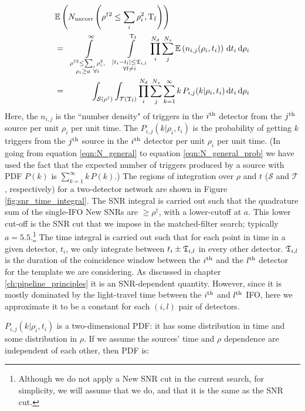 \begin{eqnarray}
\lefteqn{ \Exptd\left(N_{\mathrm{uncorr}}\left(\rho^{\dagger2} \leq \sum_i\rho_i^2, \Tf \right)\right) } \nonumber \\
\label{eqn:N_general}
& = & \int\limits_{\substack{\rho^{\dagger2} \leq \sum_i\rho_i^2, \\ \rho_i \geq a ~ \forall i}}^{\infty}~~ \int\limits_{\substack{ |t_i - t_l| \leq \coincT_{i,l} \\ \forall l \neq i}}^{\Tf} \prod_i^{N_d} \sum_j^{N_s} \Exptd\left(n_{i,j}(\rho_i,t_i) \right) \d t_i \d\rho_i \\ 
\label{eqn:N_general_prob}
& = & \int_{\mathcal{S}(\rho^\dagger)} \int_{\mathcal{T}(\Tf)} \prod_i^{N_d} \sum_j^{N_s}  \sum_{k=1}^{\infty} k\,P_{i,j}(k|\rho_i,t_i) \d t_i \d\rho_i 
\end{eqnarray}
Here, the $n_{i,j}$ is the ``number density" of triggers in the $i^{\mathrm{th}}$ detector from the $j^{\mathrm{th}}$ source per unit $\rho_i$ per unit time. The $P_{i,j}(k|\rho_i,t_i)$ is the probability of getting $k$ triggers from the $j^{\mathrm{th}}$ source in the $i^{\mathrm{th}}$ detector per unit $\rho_i$ per unit time. (In going from equation \ref{eqn:N_general} to equation \ref{eqn:N_general_prob} we have used the fact that the expected number of triggers produced by a source with \ac{PDF} $P(k)$ is $\sum_{k=1}^{\infty} k\,P(k)$.) The regions of integration over $\rho$ and $t$ ($\mathcal{S}$ and $\mathcal{T}$, respectively) for a two-detector network are shown in Figure \ref{fig:snr_time_integral}. The \ac{SNR} integral is carried out such that the quadrature sum of the single-\ac{IFO} New \acp{SNR} are $\geq \rho^\dagger$, with a lower-cutoff at $a$. This lower cut-off is the \ac{SNR} cut that we impose in the matched-filter search; typically $a=5.5$.\footnote{Although we do not apply a New \ac{SNR} cut in the current search, for simplicity, we will assume that we do, and that it is the same as the \ac{SNR} cut.} The time integral is carried out such that for each point in time in a given detector, $t_i$, we only integrate between $t_i \pm \mathfrak{T}_{i,l}$ in every other detector. $\mathfrak{T}_{i,l}$ is the duration of the coincidence window between the $i^{\mathrm{th}}$ and the $l^{\mathrm{th}}$ detector for the template we are considering. As discussed in chapter \ref{ch:pipeline_principles} it is an \ac{SNR}-dependent quantity. However, since it is mostly dominated by the light-travel time between the $i^{\mathrm{th}}$ and $l^{\mathrm{th}}$ \ac{IFO}, here we approximate it to be a constant for each $(i,l)$ pair of detectors. 

$P_{i,j}(k|\rho_i,t_i)$ is a two-dimensional \ac{PDF}: it has some distribution in time and some distribution in $\rho$. If we assume the sources' time and $\rho$ dependence are independent of each other, then \ac{PDF} is:

